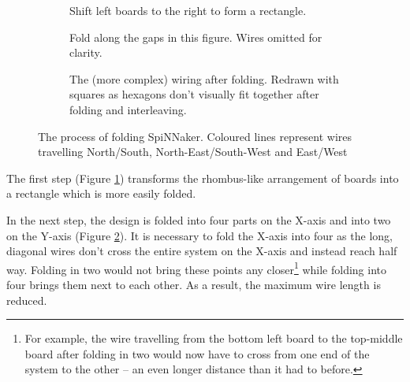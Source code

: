 			\begin{figure}
				\center
				\begin{subfigure}[b]{\textwidth}
					\center
					
					\caption{Shift left boards to the right to form a rectangle.}
					\label{fig:boardsFoldedShift}
				\end{subfigure}
				
				\vspace{2ex}
				
				\begin{subfigure}[b]{\textwidth}
					\center
					
					\caption{Fold along the gaps in this figure. Wires omitted for
					clarity.}
					\label{fig:boardsFoldedSpaced}
				\end{subfigure}
				
				\vspace{2ex}
				
				\begin{subfigure}[b]{\textwidth}
					\center
					
					\caption{The (more complex) wiring after folding. Redrawn with squares
					as hexagons don't visually fit together after folding and
					interleaving.}
					\label{fig:boardsFoldedInterleaved}
				\end{subfigure}
				
				\caption[Folding SpiNNaker]{The process of folding SpiNNaker. Coloured
				lines represent wires travelling {\color{red}North/South},
				{\color{green}North-East/South-West} and {\color{blue}East/West}}
				\label{fig:boardsFolded}
			\end{figure}
			
			The first step (Figure \ref{fig:boardsFoldedShift}) transforms the
			rhombus-like arrangement of boards into a rectangle which is more easily
			folded.
			
			In the next step, the design is folded into four parts on the X-axis and
			into two on the Y-axis (Figure \ref{fig:boardsFoldedSpaced}). It is
			necessary to fold the X-axis into four as the long, diagonal wires don't
			cross the entire system on the X-axis and instead reach half way. Folding
			in two would not bring these points any closer\footnote{For example, the
			wire travelling from the bottom left board to the top-middle board after
			folding in two would now have to cross from one end of the system to the
			other -- an even longer distance than it had to before.} while folding
			into four brings them next to each other. As a result, the maximum wire
			length is reduced.
			
